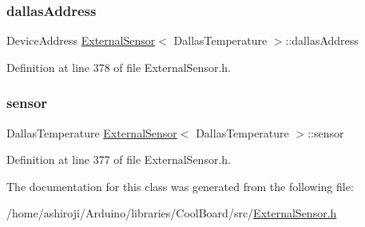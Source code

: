 \subsubsection{\texorpdfstring{dallas\+Address}{dallasAddress}}
{\footnotesize\ttfamily Device\+Address \hyperlink{class_external_sensor}{External\+Sensor}$<$ Dallas\+Temperature $>$\+::dallas\+Address\hspace{0.3cm}{\ttfamily [private]}}



Definition at line 378 of file External\+Sensor.\+h.

\mbox{\label{class_external_sensor_3_01_dallas_temperature_01_4_adb6ba4fcdedef95ad8f6b0c9b6c0f9d1}} 
\subsubsection{\texorpdfstring{sensor}{sensor}}
{\footnotesize\ttfamily Dallas\+Temperature \hyperlink{class_external_sensor}{External\+Sensor}$<$ Dallas\+Temperature $>$\+::sensor\hspace{0.3cm}{\ttfamily [private]}}



Definition at line 377 of file External\+Sensor.\+h.



The documentation for this class was generated from the following file\+:\begin{DoxyCompactItemize}
\item 
/home/ashiroji/\+Arduino/libraries/\+Cool\+Board/src/\hyperlink{_external_sensor_8h}{External\+Sensor.\+h}\end{DoxyCompactItemize}
